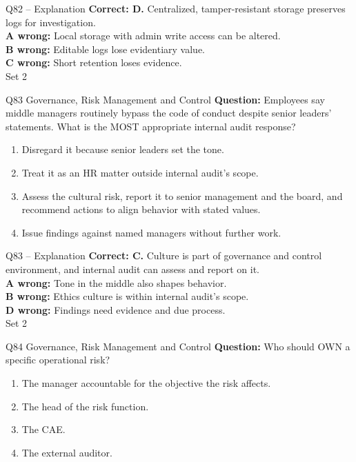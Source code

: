 \documentclass[aspectratio=169,10pt]{beamer}
\begin{document}
\begin{frame}[t]{Q82 -- Explanation}
	\footnotesize
	\textbf{Correct: D.} Centralized, tamper-resistant storage preserves logs for investigation. \\[5pt]
\textbf{A wrong:} Local storage with admin write access can be altered. \\[3pt]
\textbf{B wrong:} Editable logs lose evidentiary value. \\[3pt]
\textbf{C wrong:} Short retention loses evidence. \\[3pt]
	\vfill {\tiny Set 2}
\end{frame}

\begin{frame}[t]{Q83 \hfill {\scriptsize Governance, Risk Management and Control}}
	\small
	\textbf{Question:} Employees say middle managers routinely bypass the code of conduct despite senior leaders' statements. What is the MOST appropriate internal audit response?
	\begin{enumerate}[label=\Alph*.,itemsep=1pt,topsep=3pt]
			\item Disregard it because senior leaders set the tone.
			\item Treat it as an HR matter outside internal audit's scope.
			\item Assess the cultural risk, report it to senior management and the board, and recommend actions to align behavior with stated values.
			\item Issue findings against named managers without further work.
	\end{enumerate}
\end{frame}

\begin{frame}[t]{Q83 -- Explanation}
	\footnotesize
	\textbf{Correct: C.} Culture is part of governance and control environment, and internal audit can assess and report on it. \\[5pt]
\textbf{A wrong:} Tone in the middle also shapes behavior. \\[3pt]
\textbf{B wrong:} Ethics culture is within internal audit's scope. \\[3pt]
\textbf{D wrong:} Findings need evidence and due process. \\[3pt]
	\vfill {\tiny Set 2}
\end{frame}

\begin{frame}[t]{Q84 \hfill {\scriptsize Governance, Risk Management and Control}}
	\small
	\textbf{Question:} Who should OWN a specific operational risk?
	\begin{enumerate}[label=\Alph*.,itemsep=1pt,topsep=3pt]
			\item The manager accountable for the objective the risk affects.
			\item The head of the risk function.
			\item The CAE.
			\item The external auditor.
	\end{enumerate}
\end{frame}
\end{document}
